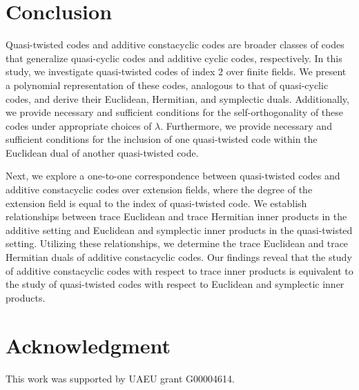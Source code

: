 \documentclass[12 pt]{extarticle}
\numberwithin{equation}{section}
\theoremstyle{definition}
\begin{document}
\section{Conclusion}\label{conclusion}
Quasi-twisted codes and additive constacyclic codes are broader classes of codes that generalize quasi-cyclic codes and additive cyclic codes, respectively. In this study, we investigate quasi-twisted codes of index $2$ over finite fields. We present a polynomial representation of these codes, analogous to that of quasi-cyclic codes, and derive their Euclidean, Hermitian, and symplectic duals. Additionally, we provide necessary and sufficient conditions for the self-orthogonality of these codes under appropriate choices of $\lambda$. Furthermore, we provide necessary and sufficient conditions for the inclusion of one quasi-twisted code within the Euclidean dual of another quasi-twisted code.


Next, we explore a one-to-one correspondence between quasi-twisted codes and additive constacyclic codes over extension fields, where the degree of the extension field is equal to the index of quasi-twisted code. We establish relationships between trace Euclidean and trace Hermitian inner products in the additive setting and Euclidean and symplectic inner products in the quasi-twisted setting. Utilizing these relationships, we determine the trace Euclidean and trace Hermitian duals of additive constacyclic codes. Our findings reveal that the study of additive constacyclic codes with respect to trace inner products is equivalent to the study of quasi-twisted codes with respect to Euclidean and symplectic inner products.  


\section*{Acknowledgment}

This work was supported by UAEU grant G00004614.  




	
\end{document}
